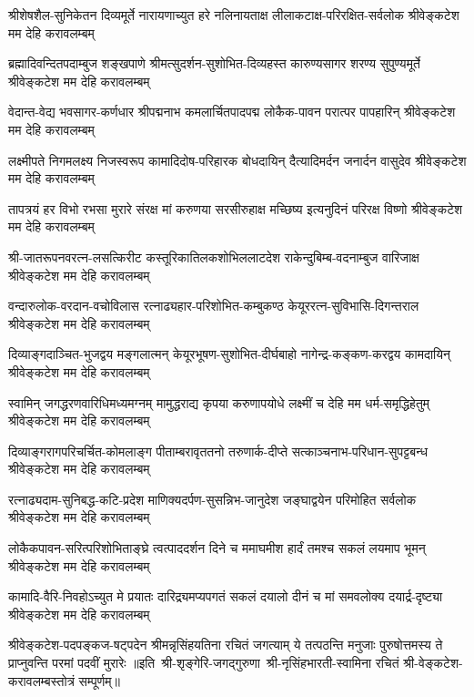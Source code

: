 \fourlineindentedshloka
{श्रीशेषशैल-सुनिकेतन दिव्यमूर्ते}
{नारायणाच्युत हरे नलिनायताक्ष}
{लीलाकटाक्ष-परिरक्षित-सर्वलोक}
{श्रीवेङ्कटेश मम देहि करावलम्बम्}

\fourlineindentedshloka
{ब्रह्मादिवन्दितपदाम्बुज शङ्खपाणे}
{श्रीमत्सुदर्शन-सुशोभित-दिव्यहस्त}
{कारुण्यसागर शरण्य सुपुण्यमूर्ते}
{श्रीवेङ्कटेश मम देहि करावलम्बम्}

\fourlineindentedshloka
{वेदान्त-वेद्य भवसागर-कर्णधार}
{श्रीपद्मनाभ कमलार्चितपादपद्म}
{लोकैक-पावन परात्पर पापहारिन्}
{श्रीवेङ्कटेश मम देहि करावलम्बम्}

\fourlineindentedshloka
{लक्ष्मीपते निगमलक्ष्य निजस्वरूप}
{कामादिदोष-परिहारक बोधदायिन्}
{दैत्यादिमर्दन जनार्दन वासुदेव}
{श्रीवेङ्कटेश मम देहि करावलम्बम्}

\fourlineindentedshloka
{तापत्रयं हर विभो रभसा मुरारे}
{संरक्ष मां करुणया सरसीरुहाक्ष}
{मच्छिष्य इत्यनुदिनं परिरक्ष विष्णो}
{श्रीवेङ्कटेश मम देहि करावलम्बम्}

\fourlineindentedshloka
{श्री-जातरूपनवरत्न-लसत्किरीट}
{कस्तूरिकातिलकशोभिललाटदेश}
{राकेन्दुबिम्ब-वदनाम्बुज वारिजाक्ष}
{श्रीवेङ्कटेश मम देहि करावलम्बम्}

\fourlineindentedshloka
{वन्दारुलोक-वरदान-वचोविलास}
{रत्नाढ्यहार-परिशोभित-कम्बुकण्ठ}
{केयूररत्न-सुविभासि-दिगन्तराल}
{श्रीवेङ्कटेश मम देहि करावलम्बम्}

\fourlineindentedshloka
{दिव्याङ्गदाञ्चित-भुजद्वय मङ्गलात्मन्}
{केयूरभूषण-सुशोभित-दीर्घबाहो}
{नागेन्द्र-कङ्कण-करद्वय कामदायिन्}
{श्रीवेङ्कटेश मम देहि करावलम्बम्}

\fourlineindentedshloka
{स्वामिन् जगद्धरणवारिधिमध्यमग्नम्}
{मामुद्धराद्य कृपया करुणापयोधे}
{लक्ष्मीं च देहि मम धर्म-समृद्धिहेतुम्}
{श्रीवेङ्कटेश मम देहि करावलम्बम्}

\fourlineindentedshloka
{दिव्याङ्गरागपरिचर्चित-कोमलाङ्ग}
{पीताम्बरावृततनो तरुणार्क-दीप्ते}
{सत्काञ्चनाभ-परिधान-सुपट्टबन्ध}
{श्रीवेङ्कटेश मम देहि करावलम्बम्}

\fourlineindentedshloka
{रत्नाढ्यदाम-सुनिबद्ध-कटि-प्रदेश}
{माणिक्यदर्पण-सुसन्निभ-जानुदेश}
{जङ्घाद्वयेन परिमोहित सर्वलोक}
{श्रीवेङ्कटेश मम देहि करावलम्बम्}

\fourlineindentedshloka
{लोकैकपावन-सरित्परिशोभिताङ्घ्रे}
{त्वत्पाददर्शन दिने च ममाघमीश}
{हार्दं तमश्च सकलं लयमाप भूमन्}
{श्रीवेङ्कटेश मम देहि करावलम्बम्}

\fourlineindentedshloka
{कामादि-वैरि-निवहोऽच्युत मे प्रयातः}
{दारिद्र्यमप्यपगतं सकलं दयालो}
{दीनं च मां समवलोक्य दयार्द्र-दृष्ट्या}
{श्रीवेङ्कटेश मम देहि करावलम्बम्}

\fourlineindentedshloka
{श्रीवेङ्कटेश-पदपङ्कज-षट्पदेन}
{श्रीमन्नृसिंहयतिना रचितं जगत्याम्}
{ये तत्पठन्ति मनुजाः पुरुषोत्तमस्य}
{ते प्राप्नुवन्ति परमां पदवीं मुरारेः}
॥इति~श्री-शृङ्गेरि-जगद्गुरुणा~श्री-नृसिंहभारती-स्वामिना रचितं श्री-वेङ्कटेश-करावलम्बस्तोत्रं सम्पूर्णम्॥